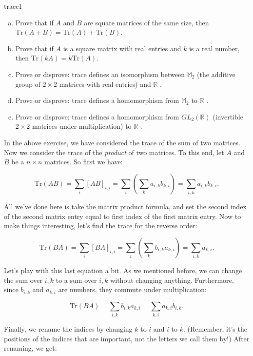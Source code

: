 \begin{exercise}{trace1}
\begin{enumerate}[(a)]
\item
Prove that if $A$ and $B$ are square matrices of the same size, then $\text{Tr} \left( A + B \right) = \text{Tr} \left( A \right) + \text{Tr} \left( B \right)$.
\item
Prove that if $A$ is a square matrix with real entries and $k$ is a real number, then $\text{Tr} \left(k A  \right) = k\text{Tr} \left( A \right)$.
\item
Prove or disprove: trace defines an isomorphism between $\mathbb{M}_2$ (the additive group of $2 \times 2$ matrices with real entries) and $\mathbb{R}$ .
\item
Prove or disprove: trace defines a homomorphism from $\mathbb{M}_2$ to $\mathbb{R}$ .
\item
Prove or disprove: trace defines a homomorphism from $GL_2(\mathbb{R})$ (invertible $2 \times 2$ matrices under multiplication)  to $\mathbb{R}$ .
\end{enumerate}
\end{exercise}


In the above exercise, we have considered the trace of the sum of two matrices. Now we consider the trace of the \emph{product} of two matrices.  To this end, let ${A}$ and  ${B}$ be a $n \times n$ matrices.  So first we have:

\[ \text{Tr} \left({A} {B}\right) = \sum_{i} [AB]_{i,i} = \sum_{i}\left( \sum_k a_{i,k}b_{k,i}\right) = \sum_{i,k}a_{i,k}b_{k,i}. \]

All we've done here is take the matrix product formula, and set the second index of the second  matrix entry equal to first index of the first matrix entry.  Now to make things interesting, let's find the trace for the reverse order:

\[ \text{Tr} \left({B} {A}\right) = \sum_{i} [BA]_{i,i} = \sum_{i} \left( \sum_{k} b_{i,k}a_{k,i} \right) = \sum_{i,k}a_{k,i}. \]

Let's play with this last equation a bit. As we mentioned before, we can change the sum over $i,k$ to a sum over $i,k$ without changing anything. Furthermore, since $b_{i,k}$ and $a_{k,i}$ are numbers, they commute under multiplication:

\[ \text{Tr} \left({B} {A}\right) =\sum_{i,k} b_{i,k}a_{k,i} =  \sum_{k,i} a_{k,i}b_{i,k}. \]

Finally, we rename the indices by changing $k$ to $i$ and $i$ to $k$.  (Remember, it's the positions of the indices that are important, not the letters we call them by!)  After renaming, we get:

